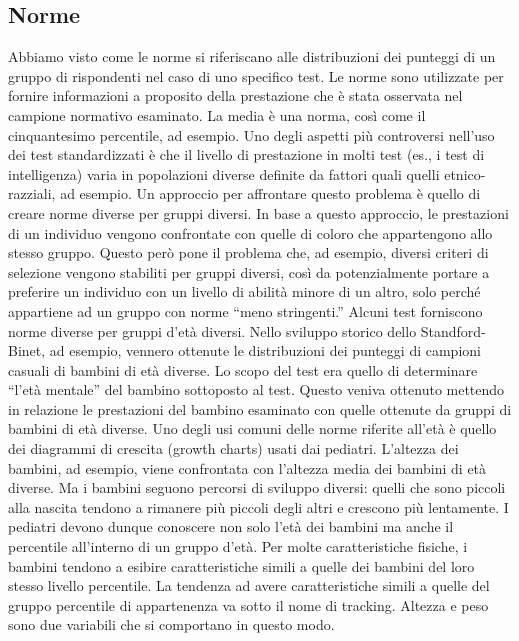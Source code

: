 \subsection{Norme}

Abbiamo visto come le norme si riferiscano alle distribuzioni dei punteggi di un gruppo di rispondenti nel caso di uno specifico test. Le norme sono utilizzate per fornire informazioni a proposito della prestazione  che è stata osservata nel campione normativo esaminato. La media è una norma, così come il cinquantesimo percentile, ad esempio.
Uno degli aspetti più controversi nell'uso dei test standardizzati è che il livello di prestazione in molti test (es., i test di intelligenza) varia in popolazioni diverse definite da fattori quali quelli etnico-razziali, ad esempio.
 Un approccio per affrontare questo problema è quello di creare norme diverse per gruppi diversi.
 In base a questo approccio, le prestazioni di un individuo vengono confrontate con quelle di coloro che appartengono allo stesso gruppo.
 Questo però pone il problema che, ad esempio, diversi criteri di selezione vengono stabiliti per gruppi diversi, così da potenzialmente portare a preferire un individuo con un livello di abilità minore di un altro, solo perché appartiene ad un gruppo con norme ``meno stringenti.''
Alcuni test forniscono norme diverse per gruppi d'età diversi.
 Nello sviluppo storico dello Standford-Binet, ad esempio, vennero ottenute le distribuzioni dei punteggi di campioni casuali di bambini di età diverse.
 Lo scopo del test era quello di determinare ``l'età mentale'' del bambino sottoposto al test.
 Questo veniva ottenuto mettendo in relazione le prestazioni del bambino esaminato con quelle ottenute da gruppi di bambini di età diverse.
Uno degli usi comuni delle norme riferite all'età è quello dei diagrammi di crescita (growth charts) usati dai pediatri.
 L'altezza dei bambini, ad esempio, viene confrontata con l'altezza media dei bambini di età diverse.
 Ma i bambini seguono percorsi di sviluppo diversi: quelli che sono piccoli alla nascita tendono a rimanere più piccoli degli altri e crescono più lentamente.
 I pediatri devono dunque conoscere non solo l'età dei bambini ma anche il percentile all'interno di un gruppo d'età.
 Per molte caratteristiche fisiche, i bambini tendono a esibire caratteristiche simili a quelle dei bambini del loro stesso livello percentile.
La tendenza ad avere caratteristiche simili a quelle del gruppo percentile di appartenenza va sotto il nome di tracking.
Altezza e peso sono due variabili che si comportano in questo modo.

